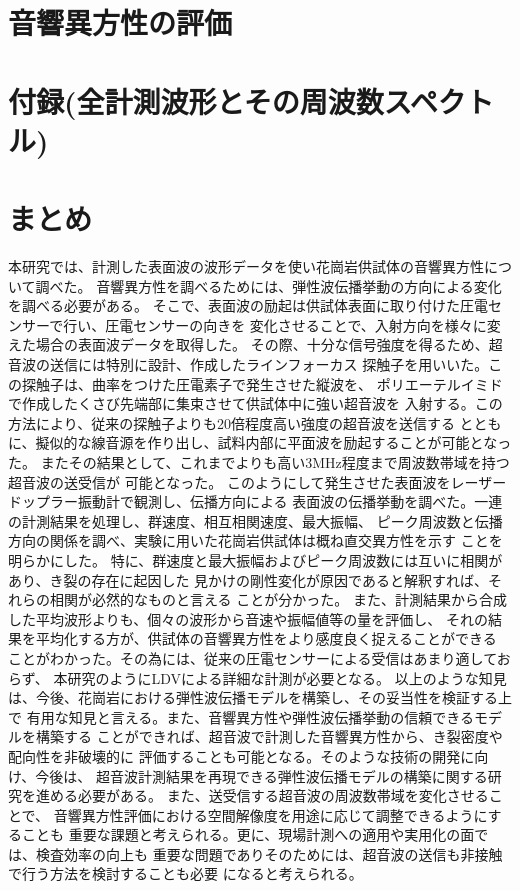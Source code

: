 ﻿\documentclass[11pt,a4j]{jarticle}
\begin{document}
\section{音響異方性の評価}

\section{付録(全計測波形とその周波数スペクトル)}

\newpage
\section{まとめ}
本研究では、計測した表面波の波形データを使い花崗岩供試体の音響異方性について調べた。
音響異方性を調べるためには、弾性波伝播挙動の方向による変化を調べる必要がある。
そこで、表面波の励起は供試体表面に取り付けた圧電センサーで行い、圧電センサーの向きを
変化させることで、入射方向を様々に変えた場合の表面波データを取得した。
その際、十分な信号強度を得るため、超音波の送信には特別に設計、作成したラインフォーカス
探触子を用いいた。この探触子は、曲率をつけた圧電素子で発生させた縦波を、
ポリエーテルイミドで作成したくさび先端部に集束させて供試体中に強い超音波を
入射する。この方法により、従来の探触子よりも20倍程度高い強度の超音波を送信する
とともに、擬似的な線音源を作り出し、試料内部に平面波を励起することが可能となった。
またその結果として、これまでよりも高い3MHz程度まで周波数帯域を持つ超音波の送受信が
可能となった。
このようにして発生させた表面波をレーザードップラー振動計で観測し、伝播方向による
表面波の伝播挙動を調べた。一連の計測結果を処理し、群速度、相互相関速度、最大振幅、
ピーク周波数と伝播方向の関係を調べ、実験に用いた花崗岩供試体は概ね直交異方性を示す
ことを明らかにした。
特に、群速度と最大振幅およびピーク周波数には互いに相関があり、き裂の存在に起因した
見かけの剛性変化が原因であると解釈すれば、それらの相関が必然的なものと言える
ことが分かった。
また、計測結果から合成した平均波形よりも、個々の波形から音速や振幅値等の量を評価し、
それの結果を平均化する方が、供試体の音響異方性をより感度良く捉えることができる
ことがわかった。その為には、従来の圧電センサーによる受信はあまり適しておらず、
本研究のようにLDVによる詳細な計測が必要となる。
以上のような知見は、今後、花崗岩における弾性波伝播モデルを構築し、その妥当性を検証する上で
有用な知見と言える。また、音響異方性や弾性波伝播挙動の信頼できるモデルを構築する
ことができれば、超音波で計測した音響異方性から、き裂密度や配向性を非破壊的に
評価することも可能となる。そのような技術の開発に向け、今後は、
超音波計測結果を再現できる弾性波伝播モデルの構築に関する研究を進める必要がある。
また、送受信する超音波の周波数帯域を変化させることで、
音響異方性評価における空間解像度を用途に応じて調整できるようにすることも
重要な課題と考えられる。更に、現場計測への適用や実用化の面では、検査効率の向上も
重要な問題でありそのためには、超音波の送信も非接触で行う方法を検討することも必要
になると考えられる。
\end{document}
